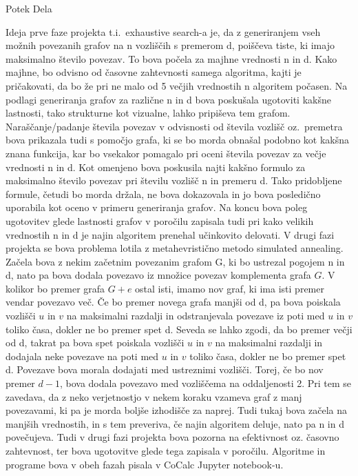 \documentclass[12pt,a4paper]{amsart}
\makeatletter
\renewcommand\section{\@startsection{section}{1}%
  \z@{.5\linespacing\@plus.7\linespacing}{.5\linespacing}%
  {\normalfont\scshape\large\centering}}
\theoremstyle{definition} %
\theoremstyle{plain} %
\makeatother
\begin{document}
\section{Potek Dela}

Ideja prve faze projekta t.i.\ exhaustive search-a je, da z generiranjem vseh možnih povezanih grafov na n vozliščih s premerom d, poiščeva tiste, ki 
imajo maksimalno število povezav. To bova počela za majhne vrednosti n in d. Kako majhne, bo odvisno od časovne zahtevnosti samega algoritma, kajti 
je pričakovati, da bo že pri ne malo od 5 večjih vrednostih n algoritem počasen. Na podlagi generiranja grafov za različne n in d bova poskušala
ugotoviti kakšne lastnosti, tako strukturne kot vizualne, lahko pripiševa tem grafom. Naraščanje/padanje števila povezav v odvisnosti od števila 
vozlišč oz.\ premetra bova prikazala tudi s pomočjo grafa, ki se bo morda obnašal podobno kot kakšna znana funkcija, kar bo vsekakor pomagalo pri oceni 
števila povezav za večje vrednosti n in d. Kot omenjeno bova poskusila najti kakšno formulo za maksimalno število povezav pri številu vozlišč n in premeru 
d. Tako pridobljene formule, četudi bo morda držala, ne bova dokazovala in jo bova posledično uporabila kot oceno v primeru generiranja grafov. Na koncu 
bova poleg ugotovitev glede lastnosti grafov v poročilu zapisala tudi pri kako velikih vrednostih n in d je najin algoritem prenehal učinkovito delovati. 
V drugi fazi projekta se bova problema lotila z metahevristično metodo simulated annealing. Začela bova z nekim začetnim povezanim grafom G, ki bo ustrezal 
pogojem n in d, nato pa bova dodala povezavo iz množice povezav komplementa grafa \(G\). V kolikor bo premer grafa \(G + e\) ostal isti, imamo nov graf, ki 
ima isti premer vendar povezavo več. Če bo premer novega grafa manjši od d, pa bova poiskala vozlišči \(u\) in \(v\) na maksimalni razdalji in odstranjevala 
povezave iz poti med \(u\) in \(v\) toliko časa, dokler ne bo premer spet d. Seveda se lahko zgodi, da bo premer večji od d, takrat pa bova spet poiskala 
vozlišči \(u\) in \(v\) na maksimalni razdalji in dodajala neke povezave na poti med \(u\) in \(v\) toliko časa, dokler ne bo premer spet d. Povezave bova morala 
dodajati med ustreznimi vozlišči. Torej, če bo nov premer \(d-1\), bova dodala povezavo med vozliščema na oddaljenosti 2. Pri tem se zavedava, da z neko 
verjetnostjo v nekem koraku vzameva graf z manj povezavami, ki pa je morda boljše izhodišče za naprej. Tudi tukaj bova začela na manjših vrednostih, 
in s tem preveriva, če najin algoritem deluje, nato pa n in d povečujeva. Tudi v drugi fazi projekta bova pozorna na efektivnost oz. časovno zahtevnost, ter 
bova ugotovitve glede tega zapisala v poročilu.\newline 
Algoritme in programe bova v obeh fazah pisala v CoCalc Jupyter notebook-u.
\vspace{10pt}
\end{document}
